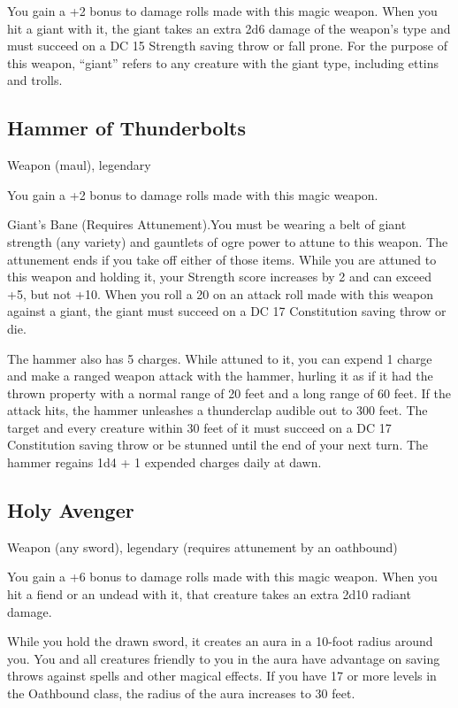 You gain a +2 bonus to damage rolls made with this magic weapon.  When you hit a giant with it, the giant takes an extra 2d6 damage of the weapon's type and must succeed on a DC 15 Strength saving throw or fall prone. For the purpose of this weapon, “giant” refers to any creature with the giant type, including ettins and trolls.

\subsection{Hammer of Thunderbolts}
Weapon (maul), legendary

You gain a +2 bonus to damage rolls made with this magic weapon.

Giant's Bane (Requires Attunement).You must be wearing a
belt of giant strength (any variety) and gauntlets of ogre power to attune to this weapon. The attunement ends if you take off either of those items. While you are attuned to this weapon and holding it, your Strength score increases by 2 and can exceed +5, but not +10. When you roll a 20 on an attack roll made with this weapon against a giant, the giant must succeed on a DC 17 Constitution saving throw or die.

The hammer also has 5 charges. While attuned to it, you can expend 1 charge and make a ranged weapon attack with the hammer, hurling it as if it had the thrown property with a normal range of 20 feet and a long range of 60 feet. If the attack hits, the hammer unleashes a thunderclap audible out to 300 feet. The target and every creature within 30 feet of it must succeed on a DC 17 Constitution saving throw or be stunned until the end of your next turn. The hammer regains 1d4 + 1 expended charges daily at dawn.

\subsection{Holy Avenger}
Weapon (any sword), legendary (requires attunement by an oathbound)

You gain a +6 bonus to damage rolls made with this magic weapon. When you hit a fiend or an undead with it, that creature takes an extra 2d10 radiant damage.

While you hold the drawn sword, it creates an aura in a 10-foot radius around you. You and all creatures friendly to you in the aura have advantage
on saving throws against spells and other magical effects. If you have 17 or more levels in the Oathbound class, the radius of the aura increases to 30 feet.


